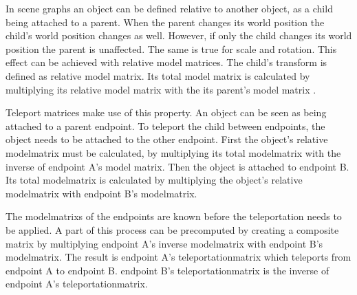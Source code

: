 In scene graphs an object can be defined relative to another object, as a child being attached to a parent. When the parent changes its world position the child's world position changes as well. However, if only the child changes its world position the parent is unaffected. The same is true for scale and rotation. This effect can be achieved with relative model matrices. The child's transform is defined as relative model matrix. Its total model matrix is calculated by multiplying its relative model matrix with the its parent's model matrix \cite{akine:2018:realtime}.

Teleport matrices make use of this property. An object can be seen as being attached to a parent \gls{endpoint}. To teleport the child between \glspl{endpoint}, the object needs to be attached to the other endpoint. First the object's relative \gls{modelmatrix} must be calculated, by multiplying its total \gls{modelmatrix} with the inverse of \gls{endpoint} A's model matrix. Then the object is attached to \gls{endpoint} B. Its total \gls{modelmatrix} is calculated by multiplying the object's relative \gls{modelmatrix} with \gls{endpoint} B's \gls{modelmatrix}.

The \glspl{modelmatrix} of the \glspl{endpoint} are known before the teleportation needs to be applied. A part of this process can be precomputed by creating a composite matrix by multiplying \gls{endpoint} A's inverse \gls{modelmatrix} with \gls{endpoint} B's \gls{modelmatrix}. The result is \gls{endpoint} A's \gls{teleportationmatrix} which teleports from \gls{endpoint} A to \gls{endpoint} B. \Gls{endpoint} B's \gls{teleportationmatrix} is the inverse of \gls{endpoint} A's \gls{teleportationmatrix}.







